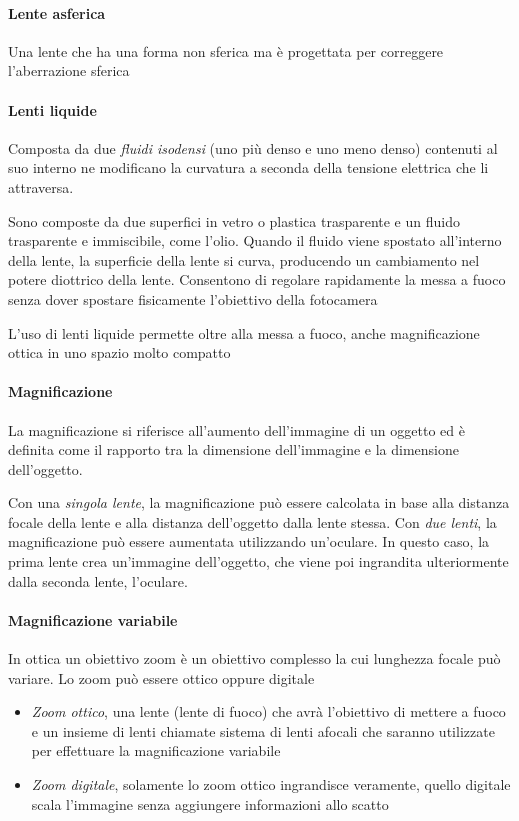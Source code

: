 \paragraph{Lente asferica} 
Una lente che ha una forma non sferica ma è progettata per correggere l'aberrazione sferica

\paragraph{Lenti liquide}
Composta da due \textit{fluidi isodensi} (uno più denso e uno meno denso) contenuti al suo interno ne modificano la curvatura a seconda della tensione elettrica che li attraversa.

Sono composte da due superfici in vetro o plastica trasparente e un fluido trasparente e immiscibile, come l'olio. Quando il fluido viene spostato all'interno della lente, la superficie della lente si curva, producendo un cambiamento nel potere diottrico della lente. Consentono di regolare rapidamente la messa a fuoco senza dover spostare fisicamente l'obiettivo della fotocamera

L’uso di lenti liquide permette oltre alla messa a fuoco, anche magnificazione ottica in uno spazio molto compatto

\paragraph{Magnificazione}
La magnificazione si riferisce all'aumento dell'immagine di un oggetto ed è definita come il rapporto tra la dimensione dell'immagine e la dimensione dell'oggetto.

Con una \textit{singola lente}, la magnificazione può essere calcolata in base alla distanza focale della lente e alla distanza dell'oggetto dalla lente stessa. Con \textit{due lenti}, la magnificazione può essere aumentata utilizzando un'oculare. In questo caso, la prima lente crea un'immagine dell'oggetto, che viene poi ingrandita ulteriormente dalla seconda lente, l'oculare.

\paragraph{Magnificazione variabile}
In ottica un obiettivo zoom è un obiettivo complesso la cui lunghezza focale può variare. Lo zoom può essere ottico oppure digitale
\begin{itemize}
    \item \textit{Zoom ottico}, una lente (lente di fuoco) che avrà l’obiettivo di mettere a fuoco e un insieme di lenti chiamate sistema di lenti afocali che saranno utilizzate per effettuare la magnificazione variabile
    \item \textit{Zoom digitale}, solamente lo zoom ottico ingrandisce veramente, quello digitale scala l’immagine senza aggiungere informazioni allo scatto
\end{itemize}

\newpage